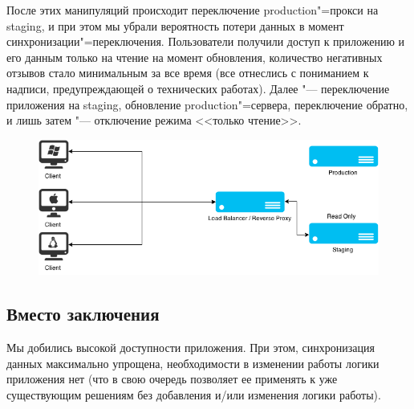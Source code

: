\documentclass[10pt, a5paper]{article}
\begin{document}
После этих манипуляций происходит переключение production"=прокси на staging, и при этом мы убрали вероятность потери данных в момент синхронизации"=переключения. Пользователи получили доступ к приложению и его данным только на чтение на момент обновления, количество негативных отзывов стало минимальным за все время (все отнеслись с пониманием к надписи, предупреждающей о технических работах). Далее "--- переключение приложения на staging, обновление production"=сервера, переключение обратно, и лишь затем "--- отключение режима <<только чтение>>.

\begin{figure}[h!]
  \centering
  \includegraphics[scale=0.36]{02_2015_10_readonly_work_on_stage}
\end{figure}

\subsection*{Вместо заключения}

Мы добились высокой доступности приложения. При этом, синхронизация данных максимально упрощена, необходимости в изменении работы логики приложения нет (что в свою очередь позволяет ее применять к уже существующим решениям без добавления и/или изменения логики работы).
\end{document}
